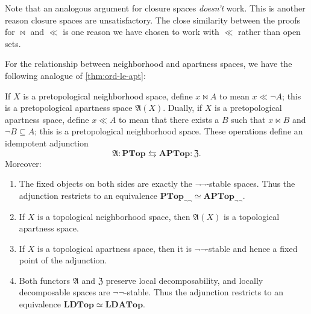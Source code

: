 \documentclass{article}
\def\cpl#1{\neg #1}
\def\anti{\mathfrak{A}}
\def\neigh{\mathfrak{Z}}
\def\nn{\ensuremath{\neg\neg}}
\def\PTop{\mathbf{PTop}}
\def\PTopnn{\mathbf{PTop}_{\nn}}
\def\LDTop{\mathbf{LDTop}}
\def\APTop{\mathbf{APTop}}
\def\APTopnn{\mathbf{APTop}_{\nn}}
\def\LDATop{\mathbf{LDATop}}
\begin{document}
Note that an analogous argument for closure spaces \emph{doesn't} work.
This is another reason closure spaces are unsatisfactory.
The close similarity between the proofs for $\bowtie$ and $\ll$ is one reason we have chosen to work with $\ll$ rather than open sets.

For the relationship between neighborhood and apartness spaces, we have the following analogue of \cref{thm:ord-le-apt}:

\begin{thm}\label{thm:top-ll-bowtie}
  If $X$ is a pretopological neighborhood space, define $x\bowtie A$ to mean $x\ll \cpl{A}$; this is a pretopological apartness space $\anti(X)$.
  Dually, if $X$ is a pretopological apartness space, define $x\ll A$ to mean that there exists a $B$ such that $x\bowtie B$ and $\cpl{B}\subseteq A$; this is a pretopological neighborhood space.
  These operations define an idempotent adjunction
  \[ \anti : \PTop \leftrightarrows \APTop : \neigh. \]
  Moreover:
  \begin{enumerate}
  \item The fixed objects on both sides are exactly the \nn-stable spaces.
    Thus the adjunction restricts to an equivalence $\PTopnn \simeq \APTopnn$.
  \item If $X$ is a topological neighborhood space, then $\anti(X)$ is a topological apartness space.
  \item If $X$ is a topological apartness space, then it is \nn-stable and hence a fixed point of the adjunction.
  \item Both functors $\anti$ and $\neigh$ preserve local decomposability, and locally decomposable spaces are \nn-stable.
    Thus the adjunction restricts to an equivalence $\LDTop \simeq \LDATop$.
    \label{item:top-ll-bowtie-equiv}
  \end{enumerate}
\end{thm}
\end{document}
